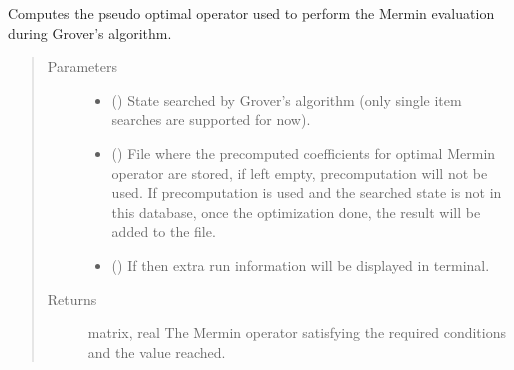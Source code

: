 \documentclass[letterpaper,10pt,english]{sphinxmanual}
\begin{document}
\begin{fulllineitems}
\label{\detokenize{mermin_eval:mermin_eval.mermin_operator_opti}}
Computes the pseudo optimal operator used to perform the Mermin evaluation 
during Grover’s algorithm.
\begin{quote}\begin{description}
\item[{Parameters}] \leavevmode\begin{itemize}
\item {} 
 (\sphinxstyleliteralemphasis{\sphinxupquote{{[}}}\sphinxstyleliteralemphasis{\sphinxupquote{{]}}}) \textendash{} State searched by Grover’s algorithm (only 
single item searches are supported for now).

\item {} 
 () \textendash{} File where the precomputed coefficients for 
optimal Mermin operator are stored, if left empty,  precomputation will
not be used. If precomputation is used and the searched state is not in 
this database, once the optimization done, the result will be added to 
the file.

\item {} 
 () \textendash{} If  then extra run information will be displayed in 
terminal.

\end{itemize}

\item[{Returns}] \leavevmode
matrix, real \textendash{} The Mermin operator satisfying the required conditions
and the value reached.

\end{description}\end{quote}

\end{fulllineitems}
\end{document}

